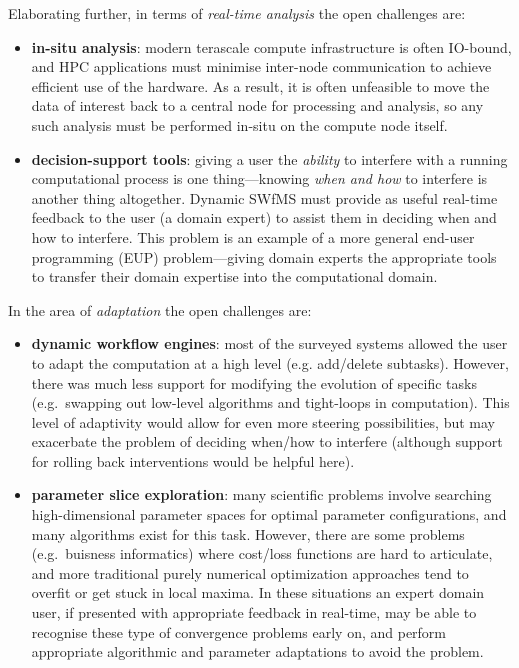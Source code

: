 \documentclass[a4paper,fontsize=12pt]{scrartcl}
\begin{document}
Elaborating further, in terms of \emph{real-time analysis} the open
challenges are:
\begin{itemize}
\item \textbf{in-situ analysis}: modern terascale compute
  infrastructure is often IO-bound, and HPC applications must minimise
  inter-node communication to achieve efficient use of the hardware.
  As a result, it is often unfeasible to move the data of interest
  back to a central node for processing and analysis, so any such
  analysis must be performed in-situ\parencite{Bennett2012} on the compute
  node itself.
\item \textbf{decision-support tools}: giving a user the
  \emph{ability} to interfere with a running computational process is
  one thing---knowing \emph{when and how} to interfere is another
  thing altogether. Dynamic SWfMS must provide as useful real-time
  feedback to the user (a domain expert) to assist them in deciding
  when and how to interfere. This problem is an example of a more
  general end-user programming (EUP)\parencite{Myers2006} problem---giving
  domain experts the appropriate tools to transfer their domain
  expertise into the computational domain.
\end{itemize}
In the area of \emph{adaptation} the open challenges are:
\begin{itemize}
\item \textbf{dynamic workflow engines}: most of the surveyed systems
  allowed the user to adapt the computation at a high level (e.g.
  add/delete subtasks). However, there was much less support for
  modifying the evolution of specific tasks (e.g.~swapping out
  low-level algorithms and tight-loops in computation). This level of
  adaptivity would allow for even more steering possibilities, but may
  exacerbate the problem of deciding when/how to interfere (although
  support for rolling back interventions would be helpful here).
\item \textbf{parameter slice exploration}: many scientific problems
  involve searching high-dimensional parameter spaces for optimal
  parameter configurations, and many algorithms exist for this task.
  However, there are some problems (e.g.~buisness informatics) where
  cost/loss functions are hard to articulate, and more traditional
  purely numerical optimization approaches tend to overfit or get
  stuck in local maxima. In these situations an expert domain user, if
  presented with appropriate feedback in real-time, may be able to
  recognise these type of convergence problems early on, and perform
  appropriate algorithmic and parameter adaptations to avoid the
  problem.
\end{itemize}
\end{document}
